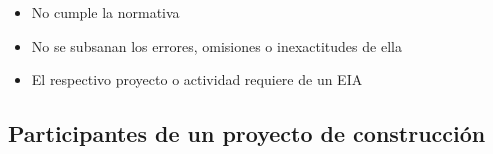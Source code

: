 \documentclass{article} %
\begin{document}
\begin{itemize}[label={},left=0pt,align=parleft]
    \item \begin{highlightbox}[levelone] No cumple la normativa \end{highlightbox}
    \item \begin{highlightbox}[levelone] No se subsanan los errores, omisiones o inexactitudes de ella \end{highlightbox}
    \item \begin{highlightbox}[levelone] El respectivo proyecto o actividad requiere de un EIA \end{highlightbox}
\end{itemize}

\subsection{Participantes de un proyecto de construcción}
\end{document}
